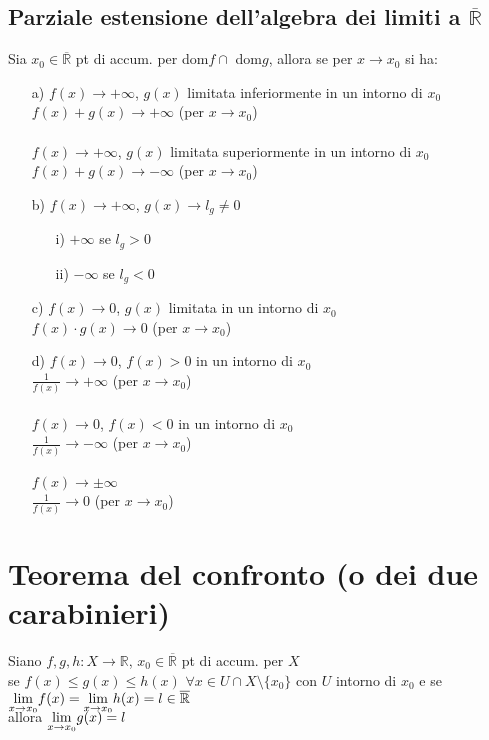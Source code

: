 \subsection{Parziale estensione dell'algebra dei limiti a $\overline{\mathbb{R}}$ }
Sia $x_0 \in \overline{\mathbb{R}}$ pt di accum. per dom$f \cap$ dom$g$, allora se per $x \to x_0$ si ha:
\begin{itemize}
\item[a)]$f(x) \to +\infty$, $g(x)$ limitata inferiormente in un intorno di $x_0$ \\
$f(x)+g(x) \longrightarrow +\infty$ (per $x \to x_0$) \\
\\
$f(x) \to +\infty$, $g(x)$ limitata superiormente in un intorno di $x_0$ \\
$f(x)+g(x) \longrightarrow -\infty$ (per $x \to x_0$)
\item[b)]$f(x) \to +\infty$, $g(x) \to l_g \not=0$
\begin{itemize}
\item[i)]$+\infty$ se $l_g>0$
\item[ii)]$-\infty$ se $l_g<0$
\end{itemize}
\item[c)]$f(x) \to 0$, $g(x)$ limitata in un intorno di $x_0$ \\
$f(x)\cdot g(x) \longrightarrow 0$ (per $x \to x_0$)
\item[d)]$f(x) \to 0$, $f(x)>0$ in un intorno di $x_0$ \\
$\frac{1}{f(x)} \longrightarrow +\infty$ (per $x \to x_0$)\\
\\
$f(x) \to 0$, $f(x)<0$ in un intorno di $x_0$ \\
$\frac{1}{f(x)} \longrightarrow -\infty$ (per $x \to x_0$) \\
\\
$f(x) \to \pm \infty$ \\
$\frac{1}{f(x)} \longrightarrow 0$ (per $x \to x_0$)
\end{itemize}
\section{Teorema del confronto (o dei due carabinieri)}
Siano $f,g,h : X \rightarrow \mathbb{R}$, $x_0 \in \overline{\mathbb{R}}$ pt di accum. per $X$ \\
se $f(x) \le g(x) \le h(x)$ $\forall x \in U \cap X \setminus \{x_0\}$ con $U$ intorno di $x_0$ 
e se $\smash{\displaystyle\lim_{x \to x_0}} f(x)= \smash{\displaystyle\lim_{x \to x_0}} h(x)=l \in \overline{\mathbb{R}}$ \\
allora $\smash{\displaystyle\lim_{x \to x_0}} g(x)=l$
